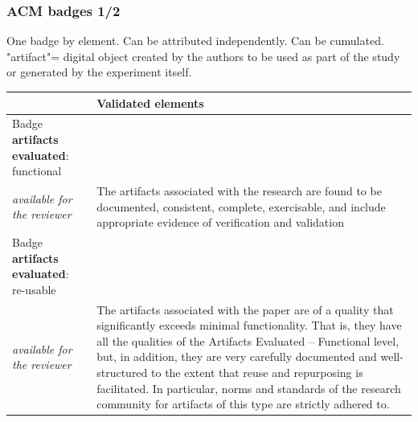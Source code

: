 \begin{frame}
\frametitle{ACM badges 1/2}
\vspace{-0.2cm}
One badge by element. Can be attributed independently. Can be cumulated.\\
"artifact"= digital object created by the authors to be used as part of the study or generated by the experiment itself.

\begin{tabular}{|p{5cm}|p{9cm}|}
  \hline
 & \cellcolor{bl1}Validated elements \\
  \hline 
  Badge  \textbf{artifacts evaluated}: functional \\ \textit{available for the reviewer}  & The artifacts associated with the research are found to be documented, consistent, complete, exercisable, and include appropriate evidence of verification and validation \\
\hline
  Badge \textbf{artifacts evaluated}: re-usable \\ \textit{available for the reviewer}   &  The artifacts associated with the paper are of a quality that significantly exceeds minimal functionality. That is, they have all the qualities of the Artifacts Evaluated – Functional level, but, in addition, they are very carefully documented and well-structured to the extent that reuse and repurposing is facilitated. In particular, norms and standards of the research community for artifacts of this type are strictly adhered to. \\
  \hline
\end{tabular}
\end{frame}





